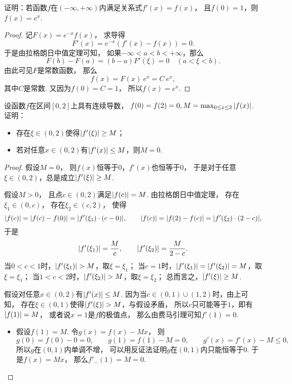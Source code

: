 \begin{example}
证明：若函数\(f\)在\((-\infty,+\infty)\)内满足关系式\(f'(x) = f(x)\)，
且\(f(0) = 1\)，则\(f(x) = e^x\).
\begin{proof}
记\(F(x) = e^{-x} f(x)\)，
求导得\[
	F'(x) = e^{-x} (f'(x) - f(x))
	= 0.
\]
于是由拉格朗日中值定理可知，
如果\(-\infty<a<b<+\infty\)，那么\[
	F(b) - F(a)
	= (b-a) F'(\xi)
	= 0
	\quad(a<\xi<b).
\]
由此可见\(F\)是常数函数，
那么\[
	f(x) = F(x)~e^x = C~e^x,
\]
其中\(C\)是常数.
又因为\(f(0) = C = 1\)，
所以\(f(x) = e^x\).
\end{proof}
\end{example}

\begin{example}
设函数\(f\)在区间\([0,2]\)上具有连续导数，
\(f(0) = f(2) = 0,
M = \max_{0 \leq x \leq 2} \abs{f(x)}\).
证明：\begin{itemize}
	\item 存在\(\xi\in(0,2)\)使得\(\abs{f'(\xi)} \geq M\)；
	\item 若对任意\(x\in(0,2)\)有\(\abs{f'(x)} \leq M\)，则\(M = 0\).
\end{itemize}
\begin{proof}
假设\(M = 0\)，
则\(f(x)\)恒等于\(0\)，\(f'(x)\)也恒等于\(0\)，
于是对于任意\(\xi\in(0,2)\)，总是成立\(\abs{f'(\xi)} \geq M\).

假设\(M > 0\)，
且点\(c\in(0,2)\)满足\(\abs{f(c)} = M\).
由拉格朗日中值定理，
存在\(\xi_1\in(0,c)\)，
存在\(\xi_2\in(c,2)\)，
使得\begin{equation*}
	\abs{f(c)}
	= \abs{f(c) - f(0)}
	= \abs{f'(\xi_1) \cdot (c - 0)},
	\qquad
	\abs{f(c)}
	= \abs{f(2) - f(c)}
	= \abs{f'(\xi_2) \cdot (2 - c)},
\end{equation*}
于是\begin{equation*}
	\abs{f'(\xi_1)} = \frac{M}{c},
	\qquad
	\abs{f'(\xi_2)} = \frac{M}{2-c}.
\end{equation*}
当\(0<c<1\)时，\(\abs{f'(\xi_1)} > M\)，取\(\xi=\xi_1\)；
当\(c=1\)时，\(\abs{f'(\xi_1)} = \abs{f'(\xi_2)} = M\)，取\(\xi=\xi_1\)；
当\(1<c<2\)时，\(\abs{f'(\xi_2)} > M\)，取\(\xi=\xi_2\)；
总而言之，\(\abs{f'(\xi)} \geq M\).

假设对任意\(x\in(0,2)\)有\(\abs{f'(x)} \leq M\).
因为当\(c\in(0,1)\cup(1,2)\)时，由上可知，
存在\(\xi\in(0,1)\)使得\(\abs{f'(\xi)} > M\)，与假设矛盾，
所以\(c\)只可能等于\(1\)，即有\(\abs{f(1)} = M\)，
或者说\(x=1\)是\(f\)的极值点，
那么由费马引理可知\(f'(1) = 0\).
\begin{itemize}
	\item 假设\(f(1) = M\).
	令\(g(x) = f(x) - M x\)，
	则\begin{equation*}
		g(0) = f(0) - 0 = 0,
		\qquad
		g(1) = f(1) - M = 0,
		\qquad
		g'(x) = f'(x) - M \leq 0,
	\end{equation*}
	所以\(g\)在\((0,1)\)内单调不增，
	可以用反证法证明\(g\)在\((0,1)\)内只能恒等于\(0\).
	于是\(f(x) = M x\)，
	那么\(f'_-(1) = M = 0\).


\end{itemize}
\end{proof}
\end{example}
